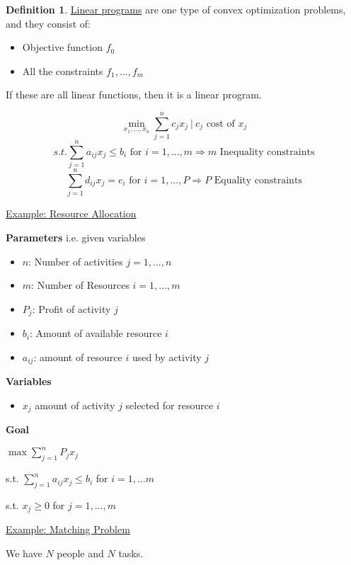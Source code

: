 \documentclass[psamsfonts, 12pt]{amsart}
\theoremstyle{definition}
\newtheorem{defn}[thm]{Definition}
\theoremstyle{remark}
\begin{document}
\begin{defn}

\underline{Linear programs} are one type of convex optimization problems, and they consist of:
\begin{itemize}
    \item Objective function $f_0$
    \item All the constraints $f_1,...,f_m$
\end{itemize}

If these are all linear functions, then it is a linear program.

\end{defn}

\[
    \min_{x_1,...,x_n} \sum_{j=1}^nc_jx_j\ |\ c_j \text{ cost of } x_j
\]
\[
    s.t. \sum_{j=1}^na_{ij}x_j \leq b_i \text{ for } i = 1,...,m \Rightarrow m \text{ Inequality constraints}
\]
\[
    \sum_{j=1}^nd_{ij}x_j = e_i \text{ for } i = 1,...,P \Rightarrow P \text{ Equality constraints}
\]

\underline{Example: Resource Allocation}

\textbf{Parameters} i.e. given variables

\begin{itemize}
    \item $n$: Number of activities $j=1,...,n$
    \item $m$: Number of Resources $i=1,...,m$
    \item $P_j$: Profit of activity $j$
    \item $b_i$: Amount of available resource $i$
    \item $a_{ij}$: amount of resource $i$ used by activity $j$
\end{itemize}

\textbf{Variables}
\begin{itemize}
    \item $x_j$ amount of activity $j$ selected for resource $i$
\end{itemize}

\textbf{Goal}

\begin{center}
 $\max \sum_{j=1}^nP_jx_j$
 
 s.t. $\sum_{j=1}^na_{ij}x_j \leq b_i$ for $i=1,...m$
 
 
 s.t. $x_j \geq 0$ for $j=1,...,m$
\end{center}

\underline{Example: Matching Problem}

We have $N$ people and $N$ tasks.
\end{document}
